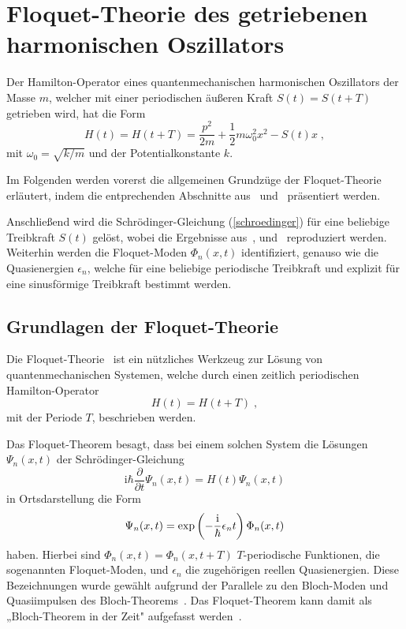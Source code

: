 \chapter{Floquet-Theorie des getriebenen harmonischen Oszillators}
\label{2}
Der Hamilton-Operator eines quantenmechanischen harmonischen Oszillators der Masse $m$, welcher mit einer periodischen äußeren Kraft $S(t)=S(t+T)$ getrieben wird, hat die Form
\begin{equation}
  H(t) = H(t+T) = \frac{p^2}{2m} + \frac{1}{2}m\omega_0^2x^2-S(t)x \; ,
  \label{H_einzelner}
\end{equation}
mit $\omega_0=\sqrt{k/m}$ und der Potentialkonstante $k$.

Im Folgenden werden vorerst die allgemeinen Grundzüge der Floquet-Theorie erläutert, indem die entprechenden Abschnitte aus~\cite{haengi} und~\cite{sherly} präsentiert werden.

Anschließend wird die Schrödinger-Gleichung (\ref{schroedinger}) für eine beliebige Treibkraft $S(t)$ gelöst, wobei die Ergebnisse aus~\cite{haengi},\cite{husimi} und~\cite{mads} reproduziert werden.
Weiterhin werden die Floquet-Moden $\Phi_n(x,t)$ identifiziert, genauso wie die Quasienergien $\epsilon_n$, welche für eine beliebige periodische Treibkraft und explizit für eine sinusförmige Treibkraft bestimmt werden.
\iffalse
Danach werden wir die Ewartungswerte $\braket{x}_n,\braket{x^2}_n,\braket{p}_n,\braket{p^2}_n$ und damit die Unschärfe berechnen, indem wir die bekannten Erwartungswerte des ungetriebenen Oszillators benutzen.
Ebenso werden wir den zeitabhängigen und gemittelten Erwartungswert der Energie $\braket{H}_n$ und $\overline H_n$ berechnen.
\fi

\section{Grundlagen der Floquet-Theorie}
  Die Floquet-Theorie~\cite{haengi} ist ein nützliches Werkzeug zur Lösung von quantenmechanischen Systemen, welche durch einen zeitlich periodischen Hamilton-Operator
  \begin{equation}
    H(t) = H(t+T) \; ,
  \end{equation}
  mit der Periode $T$, beschrieben werden.

  Das Floquet-Theorem besagt, dass bei einem solchen System die Lösungen $\Psi_n(x,t)$ der Schrödinger-Gleichung
  \begin{equation}
    \text{i}\hbar\frac{\partial}{\partial t}\Psi_n(x,t) = H(t)\Psi_n(x,t)
    \label{schroedinger}
  \end{equation}
  in Ortsdarstellung die Form
  \begin{equation}
    \Psi_n(x,t) = \exp\left(-\frac{\text i}{\hbar}\epsilon_nt\right)\Phi_n(x,t)
    \label{floquet_theorem}
  \end{equation}
  haben.
  Hierbei sind $\Phi_n(x,t) = \Phi_n(x,t+T)$ $T$-periodische Funktionen, die sogenannten Floquet-Moden, und $\epsilon_n$ die zugehörigen reellen Quasienergien.
  Diese Bezeichnungen wurde gewählt aufgrund der Parallele zu den Bloch-Moden und Quasiimpulsen des Bloch-Theorems~\cite{haengi}.
  Das Floquet-Theorem kann damit als „Bloch-Theorem in der Zeit" aufgefasst werden~\cite{sherly}.

